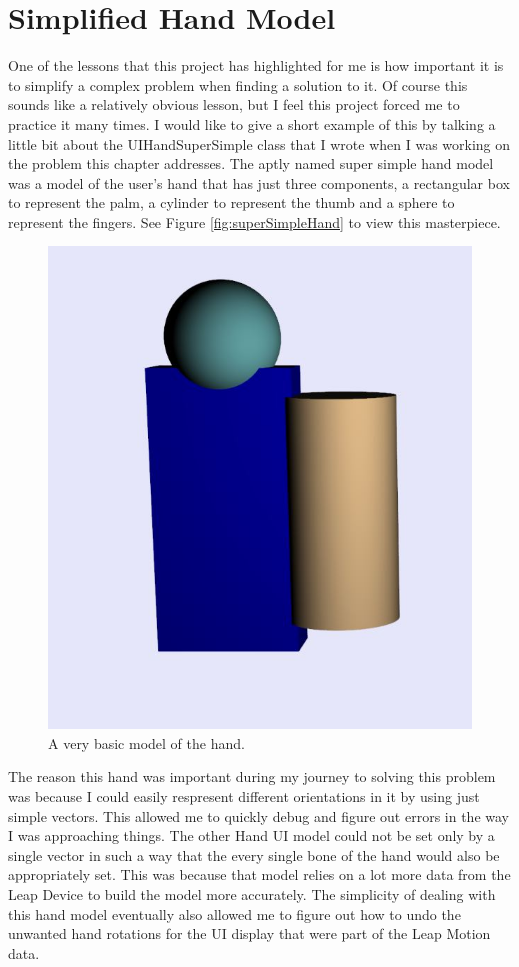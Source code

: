 \section{Simplified Hand Model}
One of the lessons that this project has highlighted for me is how important it is to simplify a complex problem when finding a solution to it. Of course this sounds like a relatively obvious lesson, but I feel this project forced me to practice it many times. I would like to give a short example of this by talking a little bit about the UIHandSuperSimple class that I wrote when I was working on the problem this chapter addresses. The aptly named super simple hand model was a model of the user's hand that has just three components, a rectangular box to represent the palm, a cylinder to represent the thumb and a sphere to represent the fingers. See Figure \ref{fig:superSimpleHand} to view this masterpiece. 
\begin{figure}[H]
\centering
\includegraphics[scale=0.65]{Figures/4_superSimpleHand.JPG}
\caption[UIHandSuperSimple Hand]{A very basic model of the hand.}
\label{fig:uncorrectedRoll}
\end{figure}
The reason this hand was important during my journey to solving this problem was because I could easily respresent different orientations in it by using just simple vectors. This allowed me to quickly debug and figure out errors in the way I was approaching things. The other Hand UI model could not be set only by a single vector in such a way that the every single bone of the hand would also be appropriately set. This was because that model relies on a lot more data from the Leap Device to build the model more accurately. The simplicity of dealing with this hand model eventually also allowed me to figure out how to undo the unwanted hand rotations for the UI display that were part of the Leap Motion data. 
	
